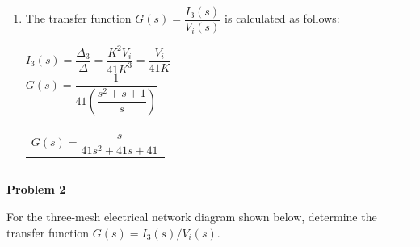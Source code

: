 \documentclass[11pt]{article}
\begin{document}
\begin{enumerate}[label=(\alph*), itemindent=*, leftmargin=*, nolistsep]
	Then, we find the numerator determinant $\Delta_3$ by replacing the third column with the constants:
	\begin{center}
		$\Delta_3 = \begin{vmatrix} 3K & -K & V_i \\ -K & 4K & 0 \\ 0 & -K & 0 \end{vmatrix}$ \\
		\vspace{10pt}
		$\Delta_3 = V_i \begin{vmatrix} -K & 4K \\ 0 & -K \end{vmatrix} = K^2 V_i$
	\end{center}

	\item The transfer function $G(s) = \dfrac{I_3(s)}{V_i(s)}$ is calculated as follows:
	\begin{center}
		$I_3(s) = \dfrac{\Delta_3}{\Delta} = \dfrac{K^2 V_i}{41K^3} = \dfrac{V_i}{41K}$ \\
		\vspace{10pt}
		$G(s) = \dfrac{1}{41 \left( \dfrac{s^2 + s + 1}{s} \right)}$ \\
		\vspace{10pt}
		\begin{tabular}{|c|}
			\hline \\
			$G(s) = \dfrac{s}{41s^2 + 41s + 41}$ \\ [12pt]
			\hline
		\end{tabular}
	\end{center}
\end{enumerate}


\newpage
  \setcounter{page}{3}  
\noindent\rule{\textwidth}{1pt}
\noindent\textbf{Problem 2} \hfill 

\noindent For the three-mesh electrical network diagram shown below, determine the transfer function $G(s) = I_3(s)/V_i(s)$.
\end{document}
